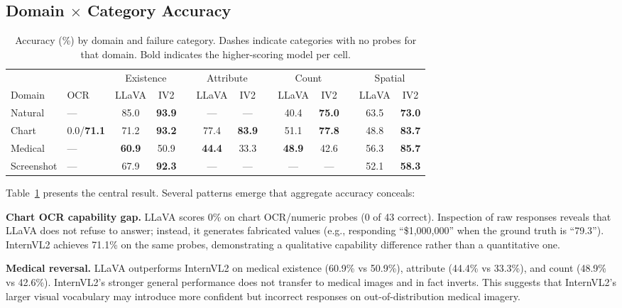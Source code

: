\documentclass[conference]{IEEEtran}
\begin{document}
\subsection{Domain $\times$ Category Accuracy}

\begin{table}[t]
\caption{Accuracy (\%) by domain and failure category. Dashes indicate categories with no probes for that domain. Bold indicates the higher-scoring model per cell.}
\label{tab:main_results}
\centering
\small
\begin{tabular}{@{}ll*{2}{c}c*{2}{c}c*{2}{c}c*{2}{c}@{}}
\toprule
& & \multicolumn{2}{c}{Existence} & & \multicolumn{2}{c}{Attribute} & & \multicolumn{2}{c}{Count} & & \multicolumn{2}{c}{Spatial} \\
\cmidrule{3-4} \cmidrule{6-7} \cmidrule{9-10} \cmidrule{12-13}
Domain & OCR & LLaVA & IV2 & & LLaVA & IV2 & & LLaVA & IV2 & & LLaVA & IV2 \\
\midrule
Natural & --- & 85.0 & \textbf{93.9} & & --- & --- & & 40.4 & \textbf{75.0} & & 63.5 & \textbf{73.0} \\
Chart & 0.0/\textbf{71.1} & 71.2 & \textbf{93.2} & & 77.4 & \textbf{83.9} & & 51.1 & \textbf{77.8} & & 48.8 & \textbf{83.7} \\
Medical & --- & \textbf{60.9} & 50.9 & & \textbf{44.4} & 33.3 & & \textbf{48.9} & 42.6 & & 56.3 & \textbf{85.7} \\
Screenshot & --- & 67.9 & \textbf{92.3} & & --- & --- & & --- & --- & & 52.1 & \textbf{58.3} \\
\bottomrule
\end{tabular}
\end{table}

Table~\ref{tab:main_results} presents the central result. Several patterns emerge that aggregate accuracy conceals:

\textbf{Chart OCR capability gap.} LLaVA scores 0\% on chart OCR/numeric probes (0 of 43 correct). Inspection of raw responses reveals that LLaVA does not refuse to answer; instead, it generates fabricated values (e.g., responding ``\$1,000,000'' when the ground truth is ``79.3''). InternVL2 achieves 71.1\% on the same probes, demonstrating a qualitative capability difference rather than a quantitative one.

\textbf{Medical reversal.} LLaVA outperforms InternVL2 on medical existence (60.9\% vs 50.9\%), attribute (44.4\% vs 33.3\%), and count (48.9\% vs 42.6\%). InternVL2's stronger general performance does not transfer to medical images and in fact inverts. This suggests that InternVL2's larger visual vocabulary may introduce more confident but incorrect responses on out-of-distribution medical imagery.
\end{document}

